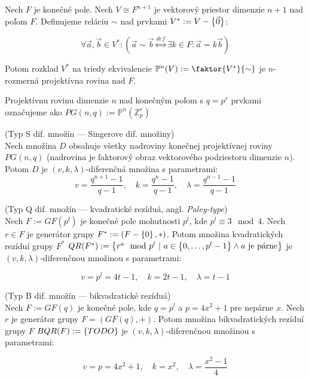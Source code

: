 \begin{definition}
\label{def:fpp1}
Nech $F$ je konečné pole. Nech $V \cong F^{n+1}$ je vektorový priestor dimenzie $n+1$ nad poľom $F$. 
Definujeme reláciu $\sim$ nad prvkami $V^* := V - \left\{\vec{0}\right\}$:

$$\forall \vec{a},\vec{b} \in V^*: \left( \vec{a} \sim \vec{b} \overset{def}{\Longleftrightarrow} \exists k \in F: \vec{a} = k \vec{b} \right)$$

Potom rozklad $V^*$ na triedy ekvivalencie $\mathbb{P}^n(V) := \faktor{V^*}{\sim}$ je $n$-rozmerná projektívna rovina nad $F$.

Projektívnu rovinu dimenzie $n$ nad konečným poľom s $q = p^r$ prvkami označujeme ako $PG(n, q) := \mathbb{P}^n\left( \mathbb{Z}_p^r \right)$

\end{definition}

\begin{theorem_hard}{(Typ S dif. množín --- Singerove dif. množiny)}\\
Nech množina $D$ obsahuje všetky nadroviny konečnej projektívnej roviny $PG(n, q)$ 
(nadrovina je faktorový obraz vektorového podriestoru dimenzie $n$). 
Potom $D$ je $(v, k, \lambda)$-diferenčná množina s parametrami:
$$v = \dfrac{q^{n+1}-1}{q-1}, \quad k = \dfrac{q^n - 1}{q-1}, \quad \lambda = \dfrac{q^{n-1}-1}{q-1}$$
\end{theorem_hard}

\begin{theorem_hard}{(Typ Q dif. množín --- kvadratické rezíduá, angl. \emph{Paley-type})}\\
Nech $F := GF(p^l)$ je konečné pole mohutnosti $p^l$, kde $p^l \equiv 3 \mod 4$. 
Nech $r \in F$ je generátor grupy $F^\ast := (F-\left\{0\right\}, \ast)$. 
Potom množina kvadratických rezíduí grupy $F^*$ $QR(F^*) := \left\{r^a \mod p^l ~|~ a \in \left\{0, \ldots, p^l-1\right\} \wedge a~\text{je párne} \right\}$
je $(v, k, \lambda)$-diferenčnou množinou s parametrami:

$$v = p^l = 4t-1, \quad k = 2t - 1, \quad \lambda = t-1$$

\end{theorem_hard}

\begin{theorem_hard}{(Typ B dif. množín --- bikvadratické rezíduá)}\\
	Nech $F := GF(q)$ je konečné pole, kde $q = p^l$ a $p = 4x^2 + 1$ pre nepárne $x$. 
	Nech $r$ je generátor grupy $F = (GF(q), +)$. 
	Potom množina bikvadratických rezíduí grupy $F$ $BQR(F) := \left\{TODO\right\}$
	je $(v, k, \lambda)$-diferenčnou množinou s parametrami:
	
	$$v = p = 4x^2+1, \quad k = x^2, \quad \lambda = \frac{x^2 - 1}{4}$$
	
	\end{theorem_hard}

